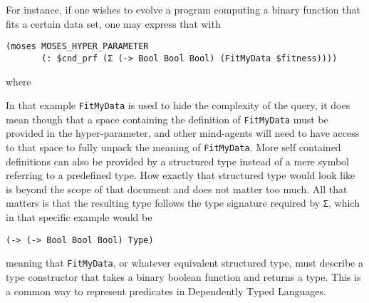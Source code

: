 \documentclass[]{report}
\begin{document}
For instance, if one wishes to evolve a program computing a binary
function that fits a certain data set, one may express that with

\begin{verbatim}
(moses MOSES_HYPER_PARAMETER
       (: $cnd_prf (Σ (-> Bool Bool Bool) (FitMyData $fitness))))
\end{verbatim}
where

In that example \texttt{FitMyData} is used to hide the complexity of
the query, it does mean though that a space containing the definition
of
\texttt{FitMyData} must be provided in the hyper-parameter, and other
mind-agents will need to have access to that space to fully unpack the
meaning of \texttt{FitMyData}.  More self contained definitions can also be
provided by a structured type instead of a mere symbol referring to a
predefined type.  How exactly that structured type would look like is
beyond the scope of that document and does not matter too much.  All
that matters is that the resulting type follows the type signature
required by \texttt{Σ}, which in that specific example would be

\begin{verbatim}
(-> (-> Bool Bool Bool) Type)
\end{verbatim}
meaning that \texttt{FitMyData}, or whatever equivalent structured type, must
describe a type constructor that takes a binary boolean function and
returns a type.  This is a common way to represent predicates in
Dependently Typed Languages.
\end{document}
